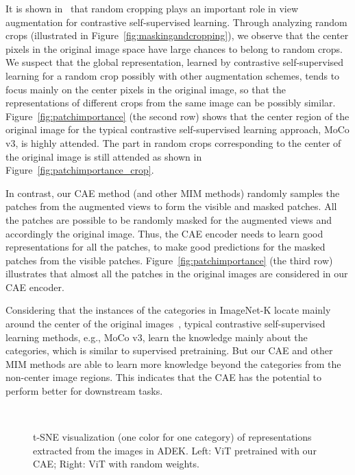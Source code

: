 \documentclass[twocolumn]{svjour3}          \smartqed  \usepackage{graphicx}
\begin{document}
It is shown in~\cite{ChenK0H20} that
random cropping
plays an important role in view augmentation 
for contrastive self-supervised learning.
Through analyzing random crops (illustrated in Figure~\ref{fig:maskingandcropping}),
we observe that
the center pixels 
in the original image space
have large chances to belong to random crops.
We suspect that
the global representation,
learned by contrastive self-supervised learning
for a random crop 
possibly
with other augmentation schemes,
tends to 
focus mainly on the center pixels
in the original image,
so that the representations
of different crops 
from the same image
can be possibly similar.
Figure~\ref{fig:patchimportance}
(the second row)
shows that 
the center region of the original image
for the typical contrastive self-supervised learning approach, MoCo v3,
is highly attended.
The part in random crops corresponding
to the center of the original image
is still attended
as shown in Figure~\ref{fig:patchimportance_crop}.



In contrast,
our CAE method
(and other MIM methods)
randomly samples the patches
from the augmented views
to form the visible and masked patches.
All the patches are possible
to be randomly masked
for the augmented views and accordingly the original image.
Thus, the CAE encoder needs to learn good representations
for all the patches,
to make good predictions
for the masked patches
from the visible patches.
Figure~\ref{fig:patchimportance} (the third row)
illustrates that almost all the patches in the original images
are considered in our CAE encoder.


Considering that
the instances of the  categories
in ImageNet-K
locate mainly around the center of the original images~\cite{russakovsky2015imagenet},
typical contrastive self-supervised learning methods, e.g., MoCo v3,
learn the knowledge mainly about the  categories,
which is similar to supervised pretraining.
But our CAE and other MIM methods
are able to  
learn more knowledge beyond
the  categories
from the non-center image regions.
This indicates that
the CAE has the potential to perform better
for downstream tasks.




\begin{figure}[t]
\centering

\setlength{\fboxsep}{1pt}
\setlength{\fboxrule}{0.4pt}
~~~~
\caption{t-SNE visualization
(one color for one category)
of representations extracted
from the images in ADEK. Left: ViT pretrained with our CAE; Right: ViT with random weights.
}
\label{fig:representationclusters}
\end{figure}
\end{document}
